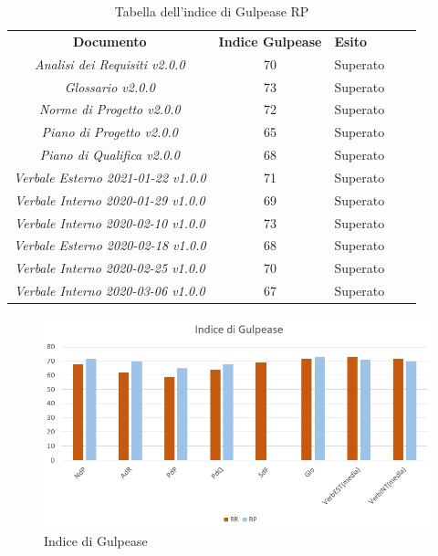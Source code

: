 \renewcommand{\arraystretch}{1.5}
\begin{longtable}{ c c  C{4cm}  c  c }
    \caption{Tabella dell'indice di Gulpease RP} \\
    \rowcolor{\primaryColor}
    \textcolor{\secondaryColor}{
    \centering\textbf{Documento}}     & \textcolor{\secondaryColor}{\centering\textbf{Indice Gulpease}}    & \textcolor{\secondaryColor}
    {\centering\textbf{Esito}} \\
    \textit{Analisi dei Requisiti v2.0.0}           & 70                                    & Superato{} \\
    \textit{Glossario v2.0.0}                       & 73                                    & Superato{} \\
    \textit{Norme di Progetto v2.0.0}               & 72                                   & Superato{} \\
    \textit{Piano di Progetto v2.0.0}                & 65                                    & Superato{} \\
    \textit{Piano di Qualifica v2.0.0}                & 68                                    & Superato{} \\
    \textit{Verbale Esterno 2021-01-22 v1.0.0}          & 71                                    & Superato{} \\
    \textit{Verbale Interno 2020-01-29 v1.0.0}          & 69                                    & Superato{} \\
    \textit{Verbale Interno 2020-02-10 v1.0.0}          & 73                                    & Superato{} \\
    \textit{Verbale Esterno 2020-02-18 v1.0.0}          & 68                                    & Superato{} \\
    \textit{Verbale Interno 2020-02-25 v1.0.0}          & 70                                    & Superato{} \\
    \textit{Verbale Interno 2020-03-06 v1.0.0}          & 67                                    & Superato{} \\
\end{longtable}

\begin{figure}[H]
	\centering
	\includegraphics[scale=0.8]{src/ResocontoVerifica/src/img/indiceGulpease.png}
	\caption{Indice di Gulpease}
\end{figure}

